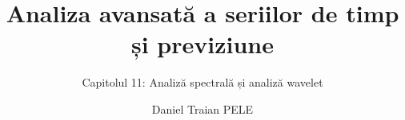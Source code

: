 \title[Analiza avansată a seriilor de timp și previziune]{Analiza avansată a seriilor de timp și previziune}
\subtitle{Capitolul 11: Analiză spectrală și analiză wavelet}
\author[D.T. Pele]{Daniel Traian PELE}
\date{}

\providecommand{\atsapplink}[3]{\hypertarget{#2}{}\hyperlink{#1}{\beamergotobutton{#3}}}  %
\providecommand{\atsappback}[2]{\begin{tikzpicture}[remember picture,overlay]\node[anchor=south east] at ([xshift=-3mm,yshift=7mm]current page.south east){\hyperlink{#1}{\beamerreturnbutton{#2}}};\end{tikzpicture}}  %
\providecommand{\atschlink}[2]{\href{#1}{#2}}  %
\providecommand{\atschlinkt}[2]{\href{#1}{\usebeamercolor[fg]{frametitle}#2}}  %


